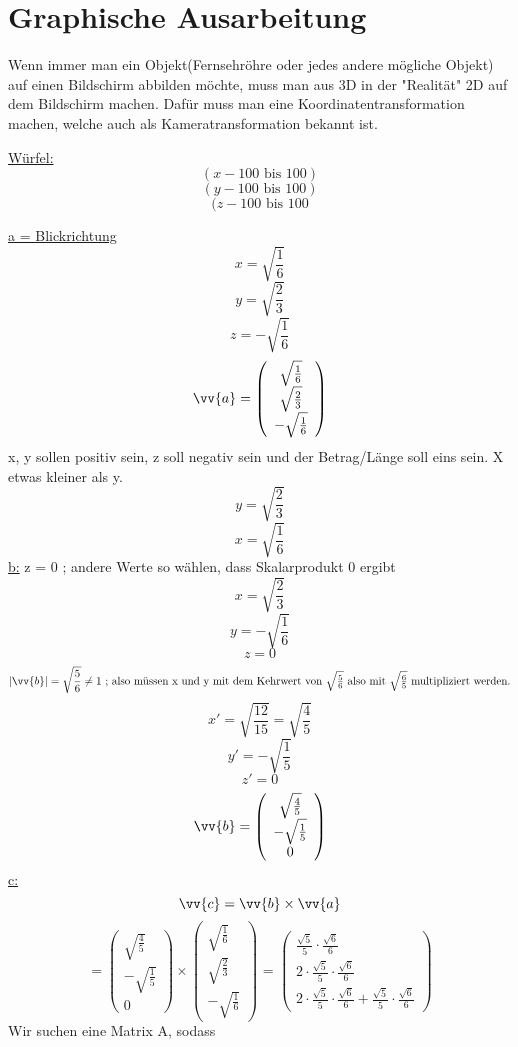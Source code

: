 \section{\textbf{Graphische Ausarbeitung}}

Wenn immer man ein Objekt(Fernsehröhre oder jedes andere mögliche Objekt) auf einen Bildschirm abbilden möchte, muss man aus 3D in der "Realität" 2D auf dem Bildschirm machen. Dafür muss man eine Koordinatentransformation machen, welche auch als Kameratransformation bekannt ist.

\underline{Würfel:}
$$(x -100 \mbox{ bis }  100)$$
$$(y-100\mbox{ bis }100)$$
$$(z-100\mbox{ bis }100$$


\underline{a = Blickrichtung}
$$x = \sqrt{\frac{1}{6}}$$
$$y = \sqrt{\frac{2}{3}}$$
$$z = -\sqrt{\frac{1}{6}}$$
$$\vv{a}=\left(\begin{array}{c} 
     \sqrt{\frac{1}{6}}\\ \sqrt{\frac{2}{3}}\\-\sqrt{\frac{1}{6}}\end{array}\right) $$
x, y sollen positiv sein, z soll negativ sein und der Betrag/Länge soll eins sein. X etwas kleiner als y.
$$y= \sqrt{\frac{2}{3}}$$
$$x= \sqrt{\frac{1}{6}}$$
\underline{b:}
z = 0 ; andere Werte so wählen, dass Skalarprodukt 0 ergibt
$$x= \sqrt{\frac{2}{3}}$$
$$y=-\sqrt{\frac{1}{6}}$$
$$z=0$$
$$|\vv{b}| = \sqrt{\frac{5}{6}}\neq 1\mbox{ ; also müssen x und y mit dem Kehrwert von $\sqrt{\frac{5}{6}}$ also mit $\sqrt{\frac{6}{5}}$ multipliziert werden.}$$
$$x' = \sqrt{\frac{12}{15}} = \sqrt{\frac{4}{5}}$$
$$y' = - \sqrt{\frac{1}{5}}$$
$$z' = 0$$
$$\vv{b}=\left(\begin{array}{c} 
      \sqrt{\frac{4}{5}}\\ -\sqrt{\frac{1}{5}}\\0\end{array}\right) $$
\underline{c:}
$$\vv{c} = \vv{b}\times  \vv{a}$$
$$= \left(\begin{array}{c} 
     \sqrt{\frac{4}{5}}\\-\sqrt{\frac{1}{5}}\\0\end{array}\right)
      \times \left(\begin{array}{c} 
     \sqrt{\frac{1}{6}}\\\sqrt{\frac{2}{3}}\\-\sqrt{\frac{1}{6}}\end{array}\right) \mbox{ = } 
     \left(\begin{array}{c} 
     \frac{\sqrt{5}}{5}\cdot\frac{\sqrt{6}}{6}\\2\cdot\frac{\sqrt{5}}{5}\cdot\frac{\sqrt{6}}{6}\\2\cdot\frac{\sqrt{5}}{5}\cdot\frac{\sqrt{6}}{6}+\frac{\sqrt{5}}{5}\cdot\frac{\sqrt{6}}{6}\end{array}\right)
$$
Wir suchen eine Matrix A, sodass

